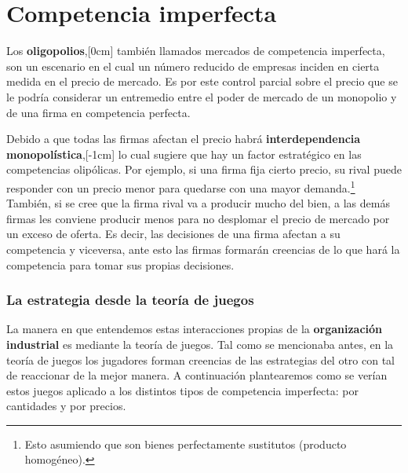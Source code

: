 \section{Competencia imperfecta}

Los \textbf{oligopolios},[0cm] también llamados mercados de competencia imperfecta, son un escenario en el cual un número reducido de empresas inciden en cierta medida en el precio de mercado. Es por este control parcial sobre el precio que se le podría considerar un entremedio entre el poder de mercado de un monopolio y de una firma en competencia perfecta.

Debido a que todas las firmas afectan el precio habrá \textbf{interdependencia monopolística},[-1cm] lo cual sugiere que hay un factor estratégico en las competencias olipólicas. Por ejemplo, si una firma fija cierto precio, su rival puede responder con un precio menor para quedarse con una mayor demanda.\footnote{Esto asumiendo que son bienes perfectamente sustitutos (producto homogéneo).} También, si se cree que la firma rival va a producir mucho del bien, a las demás firmas les conviene producir menos para no desplomar el precio de mercado por un exceso de oferta. Es decir, las decisiones de una firma afectan a su competencia y viceversa, ante esto las firmas formarán creencias de lo que hará la competencia para tomar sus propias decisiones. 

\subsubsection*{La estrategia desde la teoría de juegos}

La manera en que entendemos estas interacciones propias de la \textbf{organización industrial} es mediante la teoría de juegos. Tal como se mencionaba antes, en la teoría de juegos los jugadores forman creencias de las estrategias del otro con tal de reaccionar de la mejor manera. A continuación plantearemos como se verían estos juegos aplicado a los distintos tipos de competencia imperfecta: por cantidades y por precios. 

